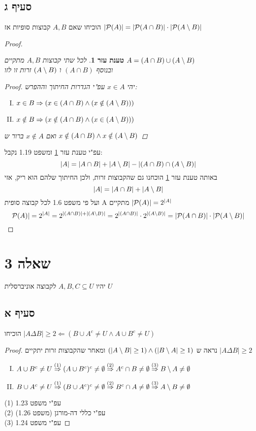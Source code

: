 \documentclass{article}
\newtheorem{lemma}{טענת עזר}
\begin{document}
	\subsection*{סעיף ג}
	הוכיחו שאם $A, B$ קבוצות סופיות אז $|\mathcal{P}(A)| = |\mathcal{P}(A \cap B)| \cdot |\mathcal{P}(A \setminus B)|$
	\begin{proof}
		\begin{lemma} \label{lemma:1}
			לכל שתי קבוצות $A, B$ מתקיים $A = (A \cap B) \cup (A \setminus B)$ \\
			ובנוסף $(A \cap B)$ ו $(A \setminus B)$ זרות זו לזו
			\begin{proof}
		יהי $x \in A$ עפ"י הגדרות החיתוך וההפרש:
				\begin{enumerate}[(I)]
					\item $x \in B \Rightarrow (x \in (A \cap B) \land (x \notin (A \setminus B)))$
					\item $x \notin B \Rightarrow (x \notin (A \cap B) \land (x \in (A \setminus B)))$
				\end{enumerate}
				ואם $x \notin A$ ברור ש $ x \notin (A \cap B) \land x \notin (A \setminus B)$
			\end{proof}
		\end{lemma}
		עפ"י טענת עזר \ref{lemma:1} ומשפט 1.19 נקבל:
		\[ |A| = |A \cap B| + |A \setminus B| - |(A \cap B) \cap (A \setminus B)| \]
		באותה טענת עזר \ref{lemma:1} הוכחנו גם שהקבוצות זרות, ולכן החיתוך שלהם הוא ריק, אזי
		\[ |A| = |A \cap B| + |A \setminus B| \]
			ועל פי משפט 1.6 לכל קבוצה סופית A מתקיים $|\mathcal{P}(A)| = 2^{|A|}$ \\
		\[
			\mathcal{P}(A)| = 2^{|A|} = 2^{|(A \cap B)| + |(A \setminus B)|}
			= 2^{|(A \cap B)|} \cdot 2^{|(A \setminus B)|}
			= |\mathcal{P}(A \cap B)| \cdot |\mathcal{P}(A \setminus B)|
		\]
	\end{proof}

	\pagebreak
	\section*{שאלה 3}
	יהיו $A, B, C \subseteq U$ לקבוצה אוניברסלית $U$
	\subsection*{סעיף א}
	הוכיחו $|A \Delta B| \geq 2 \Leftarrow (B \cup A^c \neq U \land A \cup B^c \neq U)$
	\begin{proof}
		נראה ש $(|A \setminus B| \geq 1) \land (|B \setminus A| \geq 1)$  ומאחר שהקבוצות זרות יתקיים $|A \Delta B| \geq 2$
		\begin{enumerate}[(I)]
			\item $ A \cup B^c \neq U \overset{(1)}\Rightarrow
			 (A \cup B^c)^c \neq \emptyset \overset{(2)}\Rightarrow
			 A^c \cap B \neq \emptyset \overset{(3)}\Rightarrow
			 B \setminus A \neq \emptyset$

			 \item $ B \cup A^c \neq U \overset{(1)}\Rightarrow
			 (B \cup A^c)^c \neq \emptyset \overset{(2)}\Rightarrow
			   B^c \cap A \neq \emptyset \overset{(3)}\Rightarrow
			   A \setminus B \neq \emptyset$
		\end{enumerate}
(1) עפ"י משפט 1.23 \\
(2) עפ"י כללי דה-מורגן (משפט 1.26) \\
(3) עפ"י משפט 1.24
	\end{proof}
\end{document}
